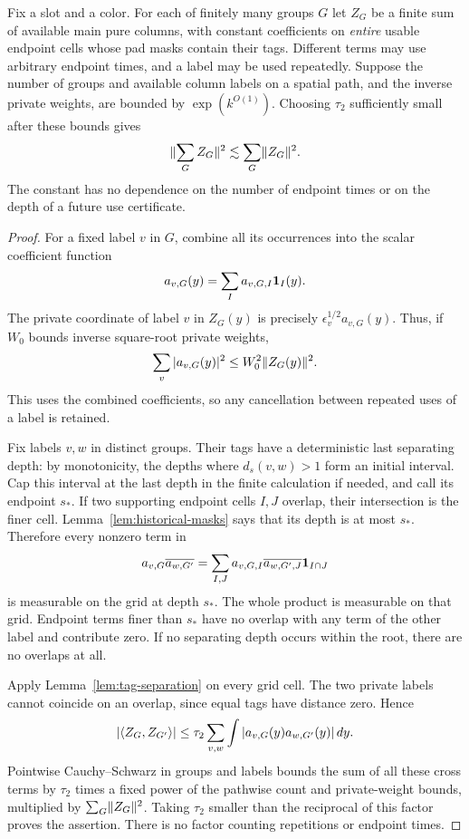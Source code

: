 \begin{lemma}
\label{lem:usable-bessel}
Fix a slot and a color.  For each of finitely many groups $G$ let $Z_G$
be a finite sum of available main pure columns, with constant
coefficients on \emph{entire} usable endpoint cells whose pad masks
contain their tags.  Different terms may use arbitrary endpoint times,
and a label may be used repeatedly.  Suppose the number of groups and
available column labels on a spatial path, and the inverse private
weights, are bounded by $\exp(k^{O(1)})$.  Choosing $\tau_2$ sufficiently
small after these bounds gives
\[
 \lVert \sum_G Z_G\rVert^2\lesssim\sum_G\lVert Z_G\rVert^2.
\]
The constant has no dependence on the number of endpoint times or on
the depth of a future use certificate.
\end{lemma}

\begin{proof}
For a fixed label $v$ in $G$, combine all its occurrences into the scalar
coefficient function
\[
 a_{v,G}(y)=\sum_I a_{v,G,I}\mathbf 1_I(y).
\]
The private coordinate of label $v$ in $Z_G(y)$ is precisely
$\epsilon_v^{1/2}a_{v,G}(y)$.  Thus, if $W_0$ bounds inverse square-root
private weights,
\[
 \sum_v|a_{v,G}(y)|^2\le W_0^2\lVert Z_G(y)\rVert^2.
\]
This uses the combined coefficients, so any cancellation between repeated
uses of a label is retained.

Fix labels $v,w$ in distinct groups.  Their tags have a deterministic
last separating depth: by monotonicity, the depths where
$d_s(v,w)>1$ form an initial interval.  Cap this interval at the last
depth in the finite calculation if needed, and call its endpoint $s_*$.
If two supporting endpoint cells $I,J$ overlap, their intersection is
the finer cell.  Lemma~\ref{lem:historical-masks} says that its depth
is at most $s_*$.  Therefore every nonzero term in
\[
 a_{v,G}\overline{a_{w,G'}}
  =\sum_{I,J}a_{v,G,I}\overline{a_{w,G',J}}\mathbf 1_{I\cap J}
\]
is measurable on the grid at depth $s_*$.  The whole product is
measurable on that grid.  Endpoint terms finer than $s_*$ have no
overlap with any term of the other label and contribute zero.  If no
separating depth occurs within the root, there are no overlaps at all.

Apply Lemma~\ref{lem:tag-separation} on every grid cell.  The two private
labels cannot coincide on an overlap, since equal tags have distance
zero.  Hence
\[
 |\langle Z_G,Z_{G'}\rangle|
 \le\tau_2\sum_{v,w}\int|a_{v,G}(y)a_{w,G'}(y)|\,dy.
\]
Pointwise Cauchy--Schwarz in groups and labels bounds the sum of all
these cross terms by $\tau_2$ times a fixed power of the pathwise count
and private-weight bounds, multiplied by
$\sum_G\lVert Z_G\rVert^2$.  Taking $\tau_2$ smaller than the reciprocal of
this factor proves the assertion.  There is no factor counting
repetitions or endpoint times.
\end{proof}

